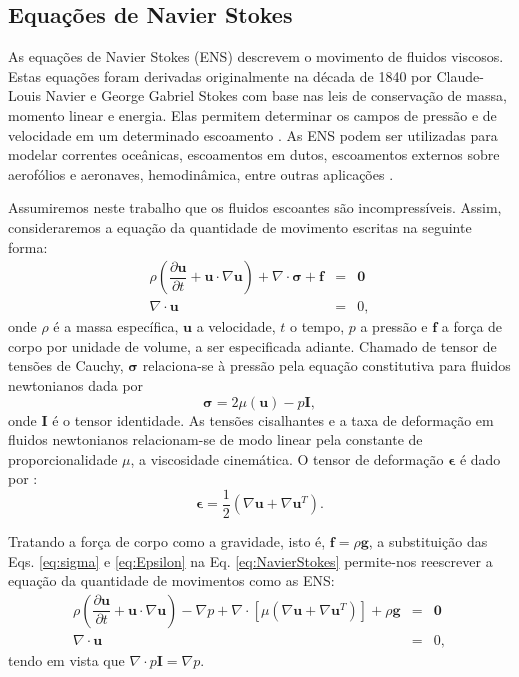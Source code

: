 \subsection{Equações de Navier Stokes}
\label{subsec:nseq}

As equações de Navier Stokes (ENS) descrevem o movimento de fluidos viscosos. Estas equações foram derivadas originalmente na década de 1840 por Claude-Louis Navier e George Gabriel Stokes com base nas leis de conservação de massa, momento linear e energia. Elas permitem determinar os campos de pressão e de velocidade em um determinado escoamento \cite{WOLFRAM}. As ENS podem ser utilizadas para modelar correntes oceânicas, escoamentos em dutos, escoamentos externos sobre aerofólios e aeronaves, hemodinâmica, entre outras aplicações \cite{Elias}.

Assumiremos neste trabalho que os fluidos escoantes são incompressíveis. Assim, consideraremos a equação da quantidade de movimento escritas na seguinte forma:
\begin{eqnarray}
	\rho \left( \dfrac{\partial \boldsymbol{u}}{\partial t} + \boldsymbol{u} \cdot \nabla \boldsymbol{u} \right) + 
	\nabla \cdot \boldsymbol{\sigma} + \boldsymbol{f} &=&  \boldsymbol{0} \label{eq:NavierStokes} \\ 
		\nabla \cdot \boldsymbol{u} &=& 0 \label{eq:NavierStokesB},
\end{eqnarray}
onde $\rho$ é a massa específica, $\boldsymbol{u}$ a velocidade, $t$ o tempo, $p$ a pressão e $\boldsymbol{f}$ a força de corpo por unidade de volume, a ser especificada adiante. Chamado de tensor de tensões de Cauchy, $\boldsymbol{\sigma}$ relaciona-se à pressão pela equação constitutiva para fluidos newtonianos dada por
\begin{equation}
\label{eq:sigma}
	\boldsymbol{\sigma} = 2 \mu \left ( \boldsymbol{u} \right ) - p\boldsymbol{I},
\end{equation}
onde $\boldsymbol{I}$ é o tensor identidade. As tensões cisalhantes e a taxa de deformação em fluidos newtonianos
relacionam-se de modo linear pela constante de proporcionalidade $\mu$, a viscosidade cinemática. O tensor de deformação $\boldsymbol{\epsilon}$ é dado por \cite{MOLON}:
\begin{equation}
\label{eq:Epsilon}
	\boldsymbol{\epsilon} = \frac{1}{2}(\nabla \boldsymbol{u} + \nabla \boldsymbol{u}^{T}).
\end{equation}

Tratando a força de corpo como a gravidade, isto é, $\boldsymbol{f} = \rho \boldsymbol{g}$, a substituição das Eqs. \eqref{eq:sigma} e \eqref{eq:Epsilon} na Eq. \eqref{eq:NavierStokes} permite-nos reescrever a equação da quantidade de movimentos como as ENS:
\begin{eqnarray}
	\rho \left( \dfrac{\partial \boldsymbol{u}}{\partial t} + \boldsymbol{u} \cdot \nabla \boldsymbol{u} \right) -
	\nabla p +
	\nabla \cdot 
	[ \mu ( \nabla \boldsymbol{u} + \nabla \boldsymbol{u}^{T}) ] 
	+ \rho \boldsymbol{g} &=& \boldsymbol{0} \label{eq:NavierStokes} \\ 
	\nabla \cdot \boldsymbol{u} &=& 0,
\end{eqnarray}
tendo em vista que $\nabla \cdot p\boldsymbol{I} = \nabla p$.